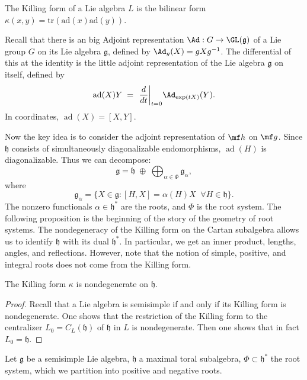 \documentclass[12pt]{article}
\begin{document}
\begin{definition}
    The Killing form of a Lie algebra $L$ is the bilinear form $\kappa(x,y) = \text{tr}(\text{ad}(x)\text{ad}(y))$.
\end{definition}
Recall that there is an big Adjoint representation $\Ad: G \to \GL(\mathfrak{g})$ of a Lie group $G$ on its Lie algebra $\mathfrak{g}$, defined by $\Ad_g(X) = gXg^{-1}$. The differential of this at the identity is the little adjoint representation of the Lie algebra $\mathfrak{g}$ on itself, defined by
\begin{align*}
    \operatorname{ad}(X)Y \;=\; \left.\frac{d}{dt}\right|_{t=0}\!\Ad_{\exp(tX)}(Y).
\end{align*}
In coordinates, $\operatorname{ad}(X) = [X,Y]$.

Now the key idea is to consider the adjoint representation of $\mf h$ on $\mf g$. Since $\mathfrak{h}$ consists of simultaneously diagonalizable endomorphisms, $\operatorname{ad}(H)$ is diagonalizable. Thus we can decompose:
\[
    \mathfrak{g} = \mathfrak{h} \;\oplus\; \bigoplus_{\alpha \in \Phi} \mathfrak{g}_\alpha,
\]
where
\[
    \mathfrak{g}_\alpha = \{ X \in \mathfrak{g} : [H,X] = \alpha(H) X \;\;\forall H\in \mathfrak{h}\}.
\]
The nonzero functionals $\alpha \in \mathfrak{h}^*$ are the roots, and $\Phi$ is the root system. The following proposition is the beginning of the story of the geometry of root systems. The nondegeneracy of the Killing form on the Cartan subalgebra allows us to identify $\mathfrak{h}$ with its dual $\mathfrak{h}^*$. In particular, we get an inner product, lengths, angles, and reflections. However, note that the notion of simple, positive, and integral roots does not come from the Killing form.

\begin{proposition}[Humphreys 8.2]
    The Killing form $\kappa$ is nondegenerate on $\mathfrak{h}$.
\end{proposition}

\begin{proof}

    Recall that a Lie algebra is semisimple if and only if its Killing form is nondegenerate. One shows that the restriction of the Killing form to the centralizer $L_0 = C_L(\mathfrak{h})$ of $\mathfrak{h}$ in $L$ is nondegenerate. Then one shows that in fact $L_0 = \mathfrak{h}$.
\end{proof}

Let $\mathfrak{g}$ be a semisimple Lie algebra, $\mathfrak{h}$ a maximal toral subalgebra, $\Phi \subset \mathfrak{h}^*$ the root system, which we partition into positive and negative roots.
\end{document}
